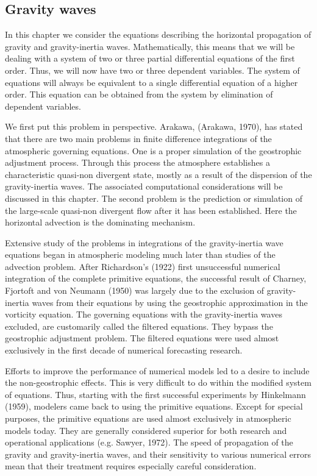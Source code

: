 \subsection{Gravity waves}
In this chapter we consider the equations describing the horizontal propagation of gravity and gravity-inertia waves. Mathematically, this means that we will be dealing with a system of two or three partial differential equations of the first order. Thus, we will now have two or three dependent variables. The system of equations will always be equivalent to a single differential equation of a higher order. This equation can be obtained from the system by elimination of dependent variables.

We first put this problem in perspective. Arakawa, (Arakawa, 1970), has stated that there are two main problems in finite difference integrations of the atmospheric governing equations. One is a proper simulation of the geostrophic adjustment process. Through this process the atmosphere establishes a characteristic quasi-non divergent state, mostly as a result of the dispersion of the gravity-inertia waves. The associated computational considerations will be discussed in this chapter. The second problem is the prediction or simulation of the large-scale quasi-non divergent flow after it has been established. Here the horizontal advection is the dominating mechanism. 

Extensive study of the problems in integrations of the gravity-inertia wave equations began in atmospheric modeling much later than studies of the advection problem. After Richardson’s (1922) first unsuccessful numerical integration of the complete primitive equations, the successful result of Charney, Fjortoft and von Neumann (1950) was largely due to the exclusion of gravity-inertia waves from their equations by using the geostrophic approximation in the vorticity equation. The governing equations with the gravity-inertia waves excluded, are customarily called the filtered equations. They bypass the geostrophic adjustment problem. The filtered equations were used almost exclusively in the first decade of numerical forecasting research.

Efforts to improve the performance of numerical models led to a desire to include the non-geostrophic effects. This is very difficult to do within the modified system of equations. Thus, starting with the first successful experiments by Hinkelmann (1959), modelers came back to using the primitive equations. Except for special purposes, the primitive equations are used almost
exclusively in atmospheric models today. They are generally considered superior for both research and operational applications (e.g. Sawyer, 1972). The speed of propagation of the gravity and gravity-inertia waves, and their sensitivity to various numerical errors mean that their treatment requires especially careful consideration.

